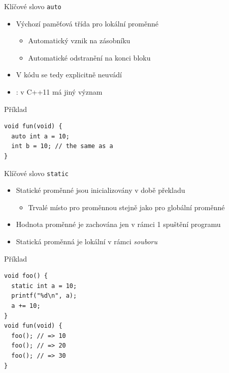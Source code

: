 \begin{frame}[fragile]{Klíčové slovo \texttt{auto}}

  \begin{itemize}
    \item Výchozí paměťová třída pro lokální proměnné
    \begin{itemize}
      \item Automatický vznik na zásobníku
      \item Automatické odstranění na konci bloku
    \end{itemize}

    \pause

    \item V kódu se tedy explicitně neuvádí

    \pause

    \item \pozor: v C++11 má jiný význam

  \end{itemize}


\begin{block}{Příklad}
\begin{lstlisting}
void fun(void) {
  auto int a = 10;
  int b = 10; // the same as a
}
\end{lstlisting}
\end{block}

\end{frame}

\begin{frame}[fragile]{Klíčové slovo \texttt{static}}

  \begin{itemize}
    \item Statické proměnné jsou inicializovány v době překladu
    \begin{itemize}
      \item Trvalé místo pro proměnnou stejně jako pro globální proměnné
    \end{itemize}

    \pause

    \item Hodnota proměnné je zachována jen v rámci 1 spuštění programu

    \pause

    \item Statická proměnná je lokální v rámci \emph{souboru}

  \end{itemize}


\begin{block}{Příklad}
\begin{lstlisting}
void foo() {
  static int a = 10;
  printf("%d\n", a);
  a += 10;
}
void fun(void) {
  foo(); // => 10
  foo(); // => 20
  foo(); // => 30
}
\end{lstlisting}
\end{block}

\end{frame}

